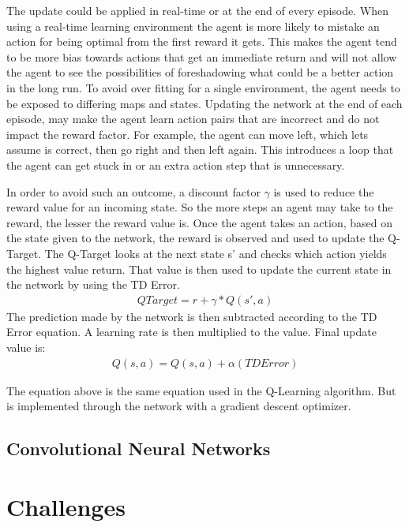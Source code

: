 The update could be applied in real-time or at the end of every episode.
When using a real-time learning environment the agent is more likely to mistake an action for being optimal from the first reward it gets. This makes the agent tend to be more bias towards actions that get an immediate return and will not allow the agent to see the possibilities of foreshadowing what could be a better action in the long run. To avoid over fitting for a single environment, the agent needs to be exposed to differing maps and states. Updating the network at the end of each episode, may make the agent learn action pairs that are incorrect and do not impact the reward factor. For example, the agent can move left, which lets assume is correct, then go right and then left again. This introduces a loop that the agent can get stuck in or an extra action step that is unnecessary. 

In order to avoid such an outcome, a discount factor $\gamma$ is used to reduce the reward value for an incoming state. So the more steps an agent may take to the reward, the lesser the reward value is. 
Once the agent takes an action, based on the state given to the network, the reward is observed and used to update the Q-Target. The Q-Target looks at the next state s' and checks which action yields the highest value return. That value is then used to update the current state in the network by using the TD Error.
\begin{align}
QTarget = r + \gamma*Q(s',a)
\end{align}
The prediction made by the network is then subtracted according to the TD Error equation. A learning rate is then multiplied to the value.
Final update value is:
\begin{align}
Q(s,a) = Q(s,a) + \alpha (TDError)
\end{align}

The equation above is the same equation used in the Q-Learning algorithm. But is implemented through the network with a gradient descent optimizer.

\subsection{Convolutional Neural Networks}

\section{Challenges}

